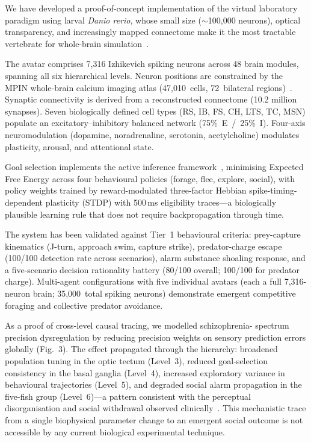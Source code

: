 \documentclass[12pt,a4paper]{article}
\begin{document}
We have developed a proof-of-concept implementation of the virtual
laboratory paradigm using larval \textit{Danio rerio}, whose small
size ($\sim$100,000 neurons), optical transparency, and increasingly
mapped connectome make it the most tractable vertebrate for
whole-brain simulation~\cite{ahrens2013}.

The avatar comprises 7,316 Izhikevich spiking neurons across 48 brain
modules, spanning all six hierarchical levels.
Neuron positions are constrained by the MPIN whole-brain calcium
imaging atlas (47,010~cells, 72~bilateral regions)~\cite{kunst2019}.
Synaptic connectivity is derived from a reconstructed connectome
(10.2 million synapses).
Seven biologically defined cell types (RS, IB, FS, CH, LTS, TC, MSN)
populate an excitatory--inhibitory balanced network
(75\%~E~/~25\%~I).
Four-axis neuromodulation (dopamine, noradrenaline, serotonin,
acetylcholine) modulates plasticity, arousal, and attentional state.

Goal selection implements the active inference framework~\cite{friston2017},
minimising Expected Free Energy across four behavioural policies
(forage, flee, explore, social), with policy weights trained by
reward-modulated three-factor Hebbian spike-timing-dependent plasticity
(STDP) with 500\,ms eligibility traces---a biologically plausible
learning rule that does not require backpropagation through time.

The system has been validated against Tier~1 behavioural criteria:
prey-capture kinematics (J-turn, approach swim, capture strike),
predator-charge escape (100/100 detection rate across scenarios),
alarm substance shoaling response, and a five-scenario decision
rationality battery (80/100 overall; 100/100 for predator charge).
Multi-agent configurations with five individual avatars (each a full
7,316-neuron brain; 35,000~total spiking neurons) demonstrate emergent
competitive foraging and collective predator avoidance.

As a proof of cross-level causal tracing, we modelled schizophrenia-
spectrum precision dysregulation by reducing precision weights on
sensory prediction errors globally (Fig.~3).
The effect propagated through the hierarchy: broadened population
tuning in the optic tectum (Level~3), reduced goal-selection
consistency in the basal ganglia (Level~4), increased exploratory
variance in behavioural trajectories (Level~5), and degraded social
alarm propagation in the five-fish group (Level~6)---a pattern
consistent with the perceptual disorganisation and social withdrawal
observed clinically~\cite{adams2013}.
This mechanistic trace from a single biophysical parameter change
to an emergent social outcome is not accessible by any current
biological experimental technique.
\end{document}
